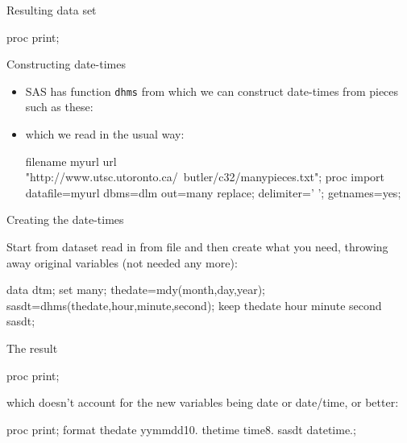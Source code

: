 \documentclass[unknownkeysallowed]{beamer}\usepackage[]{graphicx}\usepackage[]{color}
\begin{document}
\begin{frame}[fragile]{Resulting data set}

\begin{Sascode}[store=do]
proc print;  
\end{Sascode}
  
  
\end{frame}


\begin{frame}[fragile]{Constructing date-times}
  
  \begin{itemize}
  \item SAS has function \texttt{dhms} from which we can construct
    date-times from pieces such as these:
    
        
    
    
  \item which we read in the usual way:
  
    \begin{Datastep}
filename myurl url 
  "http://www.utsc.utoronto.ca/~butler/c32/manypieces.txt";      
proc import
  datafile=myurl
    dbms=dlm
    out=many
    replace;
  delimiter=' ';
  getnames=yes;
    \end{Datastep}

      
  
  
  \end{itemize}
  
\end{frame}

\begin{frame}[fragile]{Creating the date-times}
  
  Start from dataset read in from file and then create what you need,
  throwing away original variables (not needed any more):


  
    \begin{Datastep}
data dtm;
  set many;
  thedate=mdy(month,day,year);
  sasdt=dhms(thedate,hour,minute,second); 
  keep thedate hour minute second sasdt;      
    \end{Datastep}

\end{frame}

\begin{frame}[fragile]{The result}
  
  \begin{Sascode}[store=qa]
proc print;    
  \end{Sascode}
  

which doesn't account for the new variables being date or date/time,
or better:

  \begin{Sascode}[store=qab]
proc print;    
format thedate yymmdd10. thetime time8. 
  sasdt datetime.;
  \end{Sascode}
  

  
\end{frame}
\end{document}
